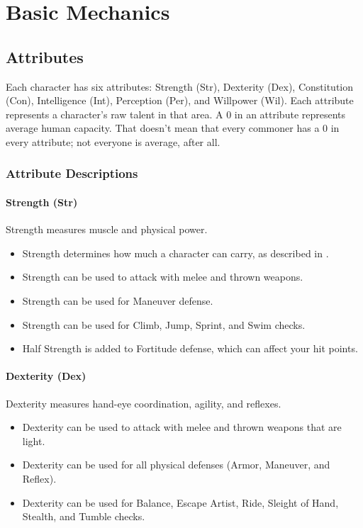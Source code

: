 \chapter{Basic Mechanics}

\section{Attributes}
Each character has six attributes: Strength (Str), Dexterity (Dex), Constitution (Con), Intelligence (Int), Perception (Per), and Willpower (Wil). Each attribute represents a character's raw talent in that area. A 0 in an attribute represents average human capacity. That doesn't mean that every commoner has a 0 in every attribute; not everyone is average, after all.

\subsection{Attribute Descriptions}

\subsubsection{Strength (Str)}
Strength measures muscle and physical power.
\begin{itemize}
    \item Strength determines how much a character can carry, as described in .
    \item Strength can be used to attack with melee and thrown weapons.
    \item Strength can be used for Maneuver defense.
    \item Strength can be used for Climb, Jump, Sprint, and Swim checks.
    \item Half Strength is added to Fortitude defense, which can affect your hit points.
\end{itemize}

\subsubsection{Dexterity (Dex)}
Dexterity measures hand-eye coordination, agility, and reflexes.
\begin{itemize}
    \item Dexterity can be used to attack with melee and thrown weapons that are light.
    \item Dexterity can be used for all physical defenses (Armor, Maneuver, and Reflex).
    \item Dexterity can be used for Balance, Escape Artist, Ride, Sleight of Hand, Stealth, and Tumble checks.
\end{itemize}

